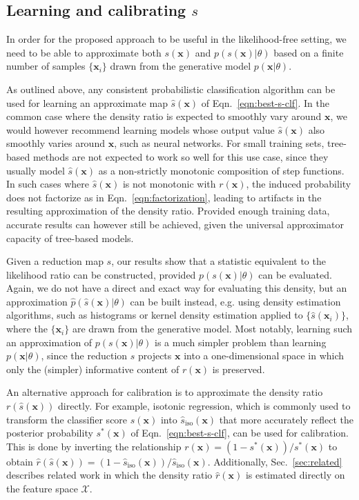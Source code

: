 \documentclass[12pt]{article}
\numberwithin{equation}{section}
\theoremstyle{plain}
\begin{document}
\subsection{Learning and calibrating $s$}\label{s:learning_calibration}

In order for the proposed approach to be useful in the likelihood-free setting,
we need to be able to approximate both $s(\mathbf{x})$ and
$p(s(\mathbf{x})|\theta)$ based on a finite number of samples $\{\mathbf{x}_i\}$
drawn from the generative model $p(\mathbf{x}|\theta)$.

As outlined above, any consistent probabilistic classification algorithm can be
used for learning an approximate  map $\hat{s}(\mathbf{x})$ of
Eqn.~\ref{eqn:best-s-clf}. In the common case where the density ratio is
expected to smoothly vary around $\mathbf{x}$, we would however recommend
learning models whose output value $\hat{s}(\mathbf{x})$ also smoothly varies
around $\mathbf{x}$, such as neural networks. For small training sets, tree-based
methods are not expected to work so well for this use case, since they usually
model $\hat{s}(\mathbf{x})$ as a non-strictly monotonic composition of step functions.
In such cases where $\hat s(\mathbf{x})$ is not monotonic with $r(\mathbf{x})$,
the induced probability does not factorize as in Eqn.~\ref{eqn:factorization},
leading to artifacts in the resulting approximation of the density ratio.
Provided enough training data, accurate results can however still be achieved,
given the universal approximator capacity of tree-based models.

Given a reduction map $s$, our results show that a statistic equivalent to the
likelihood ratio can be constructed, provided $p(s(\mathbf{x})|\theta)$ can be
evaluated. Again, we do not have a direct and exact way for evaluating this
density, but an approximation $\hat p(\hat s(\mathbf{x})| \theta)$ can be built
instead, e.g. using density estimation algorithms, such as
histograms or kernel density estimation applied to $\{\hat
s(\mathbf{x}_i)\}$, where the $\{\mathbf{x}_i\}$  are drawn from the generative
model. Most notably, learning such an approximation of $p(s(\mathbf{x})|\theta)$
is a much simpler problem than learning $p(\mathbf{x}|\theta)$, since the
reduction $s$ projects $\mathbf{x}$ into a one-dimensional space in which only
the (simpler) informative content of $r(\mathbf{x})$ is preserved.

An alternative approach for calibration is to approximate the density ratio
$r(\hat{s}(\mathbf{x}))$ directly.
For example, isotonic regression, which is commonly used to transform the classifier score  $\hat{s}(\mathbf{x})$ into $\hat{s}_\textrm{iso}(\mathbf{x})$ that more accurately reflect  the posterior probability $s^*(\mathbf{x})$
of Eqn.~\ref{eqn:best-s-clf}, can be used for calibration. This is done by inverting the relationship ${r}(\mathbf{x}) = (1-s^*(\mathbf{x}))/s^*(\mathbf{x})$ to obtain $\hat{r}(\hat{s}(\mathbf{x})) = (1-\hat{s}_\textrm{iso}(\mathbf{x}))/\hat{s}_\textrm{iso}(\mathbf{x})$.
Additionally, Sec.~\ref{sec:related} describes related work in which the density ratio $\hat{r}(\mathbf{x})$ is estimated directly on the feature space $\mathcal{X}$.
\end{document}

